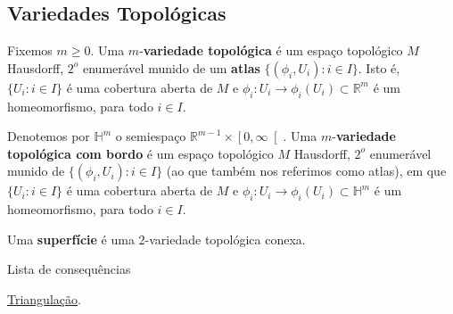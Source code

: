 \subsection{Variedades Topológicas}
\label{variedade-def}
\begin{defi}
	Fixemos $m\geq 0$. Uma $m$-\textbf{variedade topológica} é um espaço topológico $M$ Hausdorff, $2^o$ enumerável munido de um \textbf{atlas} $\{(\phi_i, U_i) : i \in I\}$. Isto é, $\{U_i : i \in I\}$ é uma cobertura aberta de $M$ e $\phi_i: U_i \to \phi_i(U_i) \subset \mathbb{R}^m$ é um homeomorfismo, para todo $i \in I$.
    
    Denotemos por $\mathbb{H}^m$ o semiespaço $\mathbb{R}^{m-1}\times \left[0,\infty\right[$. Uma $m$-\textbf{variedade topológica com bordo} é um espaço topológico $M$ Hausdorff, $2^o$ enumerável munido de $\{(\phi_i, U_i) : i \in I\}$ (ao que também nos referimos como atlas), em que $\{U_i : i \in I\}$ é uma cobertura aberta de $M$ e $\phi_i: U_i \to \phi_i(U_i) \subset \mathbb{H}^m$ é um homeomorfismo, para todo $i \in I$.

Uma \textbf{superfície} é uma 2-variedade topológica conexa.
\end{defi}

\begin{titlemize}{Lista de consequências}
	\item \hyperref[triangulacao-def]{Triangulação}.\\ %
\end{titlemize}

